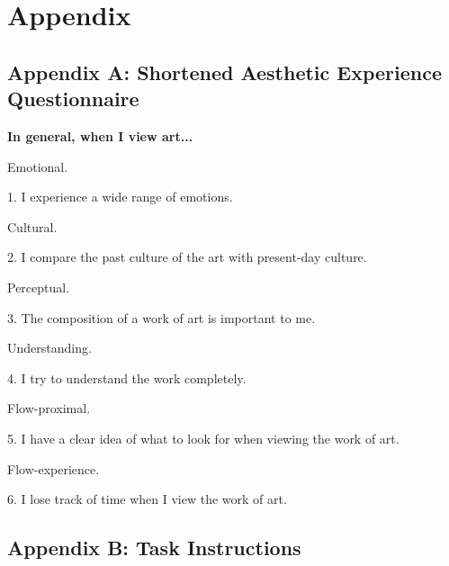 \documentclass[../main.tex]{subfiles}
\begin{document}
\section{Appendix}
\subsection{Appendix A: Shortened Aesthetic Experience Questionnaire} 
	
	\textbf{In general, when I view art...}
	
	\noindent Emotional.
	
	1. I experience a wide range of emotions.
	
	\noindent Cultural.
	
	2. I compare the past culture of the art with present-day culture.
	
	\noindent Perceptual.
	
	3. The composition of a work of art is important to me.
	
	\noindent Understanding.
	
	4. I try to understand the work completely.
	
	\noindent Flow-proximal.
	
	5. I have a clear idea of what to look for when viewing the work of art.
	
	\noindent Flow-experience.
	
	6. I lose track of time when I view the work of art.

\newpage

\subsection{Appendix B: Task Instructions}
	
\end{document}
